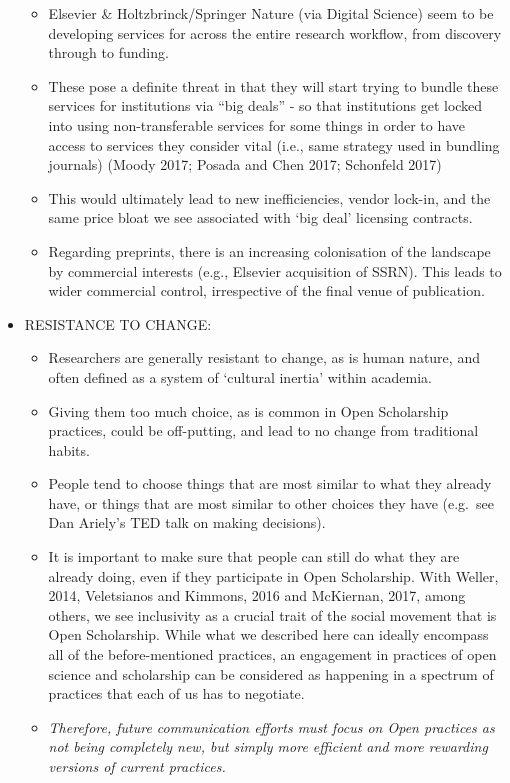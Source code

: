 \documentclass[]{article}
\begin{document}
\begin{itemize}
  \begin{itemize}
  \item
    Elsevier \& Holtzbrinck/Springer Nature (via Digital Science) seem
    to be developing services for across the entire research workflow,
    from discovery through to funding.
  \item
    These pose a definite threat in that they will start trying to
    bundle these services for institutions via ``big deals'' - so that
    institutions get locked into using non-transferable services for
    some things in order to have access to services they consider vital
    (i.e., same strategy used in bundling journals) (Moody 2017; Posada
    and Chen 2017; Schonfeld 2017)
  \item
    This would ultimately lead to new inefficiencies, vendor lock-in,
    and the same price bloat we see associated with `big deal' licensing
    contracts.
  \item
    Regarding preprints, there is an increasing colonisation of the
    landscape by commercial interests (e.g., Elsevier acquisition of
    SSRN). This leads to wider commercial control, irrespective of the
    final venue of publication.
  \end{itemize}
\item
  RESISTANCE TO CHANGE:

  \begin{itemize}
  \item
    Researchers are generally resistant to change, as is human nature,
    and often defined as a system of `cultural inertia' within academia.
  \item
    Giving them too much choice, as is common in Open Scholarship
    practices, could be off-putting, and lead to no change from
    traditional habits.
  \item
    People tend to choose things that are most similar to what they
    already have, or things that are most similar to other choices they
    have (e.g.~see Dan Ariely's TED talk on making decisions).
  \item
    It is important to make sure that people can still do what they are
    already doing, even if they participate in Open Scholarship. With
    Weller, 2014, Veletsianos and Kimmons, 2016 and McKiernan, 2017,
    among others, we see inclusivity as a crucial trait of the social
    movement that is Open Scholarship. While what we described here can
    ideally encompass all of the before-mentioned practices, an
    engagement in practices of open science and scholarship can be
    considered as happening in a spectrum of practices that each of us
    has to negotiate.
  \item
    \emph{Therefore, future communication efforts must focus on Open
    practices as not being completely new, but simply more efficient and
    more rewarding versions of current practices.}
  \end{itemize}
\end{itemize}
\end{document}
